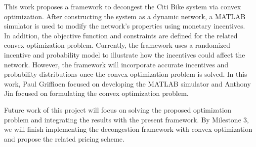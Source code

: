 \documentclass[times, 10pt,twocolumn]{article}
\begin{document}


This work proposes a framework to decongest the Citi Bike system via convex optimization. After constructing the system as a dynamic network, a MATLAB simulator is used to modify the network's properties using monetary incentives. In addition, the objective function and constraints are defined for the related convex optimization problem. Currently, the framework uses a randomized incentive and probability model to illustrate how the incentives could affect the network. However, the framework will incorporate accurate incentives and probability distributions once the convex optimization problem is solved. In this work, Paul Griffioen focused on developing the MATLAB simulator and Anthony Jin focused on formulating the convex optimization problem.

Future work of this project will focus on solving the proposed optimization problem and integrating the results with the present framework. By Milestone 3, we will finish implementing the decongestion framework with convex optimization and propose the related pricing scheme.

\end{document}
